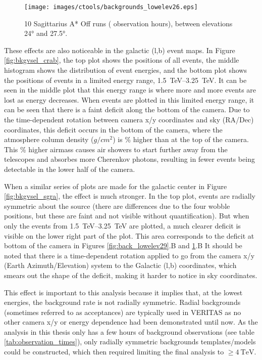     \begin{figure}[ht]
      \centering
      \texttt{[image: images/ctools/backgrounds\_lowelev26.eps]}
      \caption[CTOOLS Background at \ang{26} Elevation]{
        10 Sagittarius A* Off runs ( observation hours), between elevations \ang{24} and \ang{27.5}. 
      }
      \label{fig:back_lowelev26}
    \end{figure}
  
  These effects are also noticeable in the galactic (l,b) event maps.
  In Figure \ref{fig:bkgvsel_crab}, the top plot shows the positions of all events, the middle histogram shows the distribution of event energies, and the bottom plot shows the positions of events in a limited energy range, \SIrange{1.5}{3.25}{\TeV}.
  It can be seen in the middle plot that this energy range is where more and more events are lost as energy decreases.
  When events are plotted in this limited energy range, it can be seen that there is a faint deficit along the bottom of the camera.
  Due to the time-dependent rotation between camera x/y coordinates and sky (RA/Dec) coordinates, this deficit occurs in the bottom of the camera, where the atmosphere column density ($g/cm^2$) is \% higher than at the top of the camera.
  This \% higher airmass causes air showers to start further away from the telescopes and absorbes more Cherenkov photons, resulting in fewer events being detectable in the lower half of the camera.

  When a similar series of plots are made for the galactic center in Figure \ref{fig:bkgvsel_sgra}, the effect is much stronger.
  In the top plot, events are radially symmetric about the source (there are differences due to the four wobble positions, but these are faint and not visible without quantification).
  But when only the events from \SIrange{1.5}{3.25}{\TeV} are plotted, a much clearer deficit is visible on the lower right part of the plot.
  This area corresponds to the deficit at bottom of the camera in Figures \ref{fig:back_lowelev29}.B and \ref{fig:back_lowelev26}.B
  It should be noted that there is a time-dependent rotation applied to go from the camera x/y (Earth Azimuth/Elevation) system to the Galactic (l,b) coordinates, which smears out the shape of the deficit, making it harder to notice in sky coordinates.
  
  This effect is important to this analysis because it implies that, at the lowest energies, the background rate is not radially symmetric.
  Radial backgrounds (sometimes referred to as acceptances) are typically used in VERITAS as no other camera x/y or energy dependence had been demonstrated until now.
  As the analysis in this thesis only has a few hours of background observations (see table \ref{tab:observation_times}), only radially symmetric backgrounds templates/models could be constructed, which then required limiting the final analysis to $\geq\SI{4}{\TeV}$.
  

